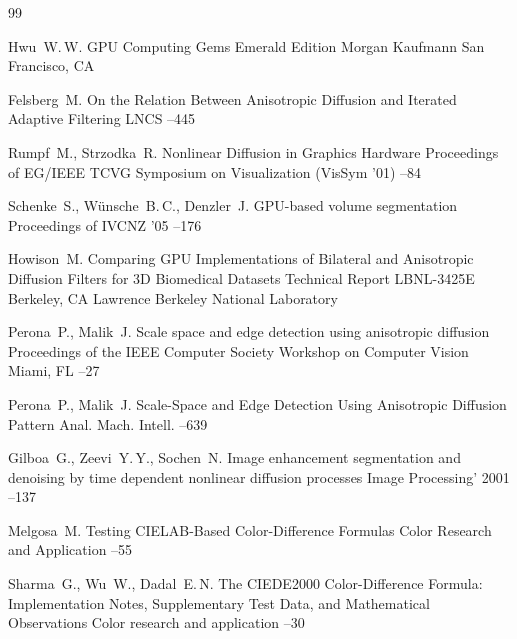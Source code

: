 \begin{thebibliography}{99}

\by Hwu~W.\,W.
\book GPU Computing Gems Emerald Edition
\publ Morgan Kaufmann
\publaddr San Francisco, CA

\by Felsberg~M.
\paper On the Relation Between Anisotropic Diffusion and Iterated Adaptive Filtering
\jour LNCS 
--445


\by Rumpf~M., Strzodka~R.
\paper Nonlinear Diffusion in Graphics Hardware
\inbook Proceedings of EG/IEEE TCVG Symposium on Visualization (VisSym ’01)
--84


\by Schenke~S., W\"unsche~B.\,C., Denzler~J.
\paper GPU-based volume segmentation
\inbook Proceedings of IVCNZ ’05
--176

\by Howison~M.
\preprint Comparing GPU Implementations of Bilateral and Anisotropic Diffusion Filters for 3D Biomedical Datasets
\preprintinfo Technical Report LBNL-3425E
\publaddr Berkeley, CA
\publ Lawrence Berkeley National Laboratory


\by Perona~P., Malik~J.  
\paper Scale space and edge detection using anisotropic diffusion
\inbook Proceedings of the IEEE Computer Society Workshop on Computer Vision
\publaddr Miami, FL
--27

\by Perona~P., Malik~J.  
\paper Scale-Space and Edge Detection Using Anisotropic Diffusion
\jour Pattern Anal. Mach. Intell.
--639


\by Gilboa~G., Zeevi~Y.\,Y., Sochen~N.
\paper Image enhancement segmentation and denoising by time dependent nonlinear diffusion processes
\inbook Image Processing' 2001
--137


\by Melgosa~M.
\paper Testing CIELAB-Based Color-Difference Formulas
\jour Color Research and Application
--55


\by Sharma~G., Wu~W., Dadal~E.\,N.
\paper The CIEDE2000 Color-Difference Formula: Implemen\-tation Notes, Supplementary Test Data, and Mathematical Observations
\jour Color research and application
--30

\end{thebibliography}



